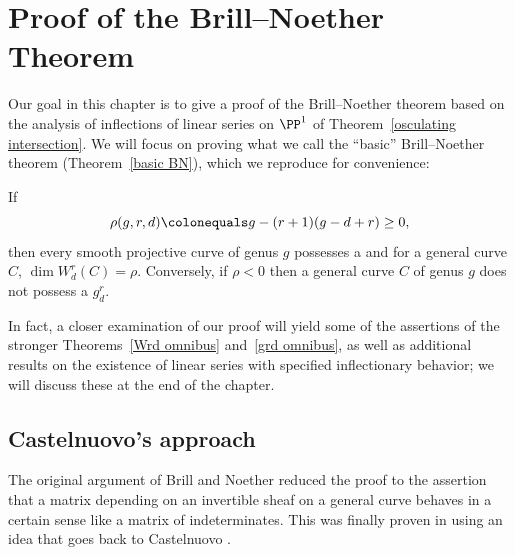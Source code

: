 

\chapter{Proof of the Brill--Noether Theorem}
\label{Brill Noether proof chapter}
\label{BrillNoetherproofChapter}

Our goal in this chapter is to give a proof of the Brill--Noether
theorem based on the analysis
of inflections of linear series on $\PP^{1}$ of
Theorem~\ref{osculating intersection}. We will focus on proving what
we call the ``basic'' Brill--Noether theorem (Theorem~\ref{basic BN}),
which we reproduce for convenience: 

\begin{theorem}\label{BN-basic}
If 
 $$
 \rho(g,r,d) \colonequals  g - (r+1)(g-d+r) \geq 0,
$$
then every smooth projective curve of genus $g$  possesses a 
%
and for a general curve $C$,  $\dim W^r_d(C) = \rho$. Conversely, if
$\rho < 0$ then a general curve $C$ of genus $g$ does not possess a $g^r_d$. 
\unif
\end{theorem}

In fact, a closer examination of our proof will yield some of the
assertions of the stronger Theorems~\ref{Wrd omnibus} 
and~\ref{grd omnibus}, as well as additional results on the existence of
linear series with specified inflectionary behavior; we will discuss these at
the end of the chapter.

\section{Castelnuovo's approach}

The original argument of Brill and Noether reduced the proof to the
assertion that a matrix depending
on an invertible sheaf on a general curve
%
behaves in a certain sense like a matrix of indeterminates. This was
finally proven in \cite{Griffiths-Harris-BN} using an idea that goes
%
back to Castelnuovo \citeyear{zbMATH02692307}.


